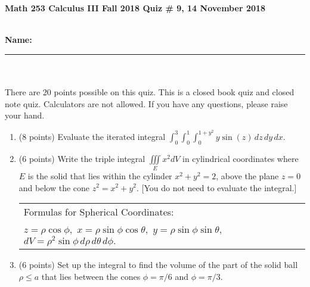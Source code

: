 \documentclass[11pt]{article}
\theoremstyle{remark}
\renewcommand{\d}{\displaystyle}
\begin{document}
{\bf Math 253 Calculus III Fall 2018 \hfill Quiz \# 9, 14 November 2018 }\\
\\
{\bf Name: \rule{3.5in}{1pt}}\\
\\
\noindent There are 20 points possible on this quiz. This is a closed
book quiz and closed note quiz. Calculators are not allowed. If you have any questions, please
raise your hand.

\begin{enumerate}
\item (8 points) Evaluate the iterated integral $\d{\int_0^{3} \int_0^1 \int_0^{1+y^2}y\sin(z)\, dz\,dy\,dx }.$
\vfill
\newpage
\item (6 points) Write the triple integral $\d{\iiint\limits_E x^2 dV }$ in cylindrical coordinates where $E$ is the solid that lies within the cylinder $x^2+y^2=2$, above the plane $z=0$ and below the cone $z^2=x^2+y^2.$ [You do not need to evaluate the integral.]
\vfill

\begin{tabular}{| l |}
\hline
Formulas for Spherical Coordinates:\\
$z=\rho \cos \phi,$ $x=\rho \sin \phi \cos \theta,$ $y=\rho \sin \phi \sin \theta,$  $dV=\rho^2 \sin \phi \,d\rho \,d\theta \,d\phi.$\\
\hline
\end{tabular}

\item (6 points) Set up the integral to find the volume of the part of the solid ball $\rho \leq a$ that lies between the cones $\phi = \pi/6$ and $\phi=\pi/3.$
\vfill 
\end{enumerate}
\end{document}
